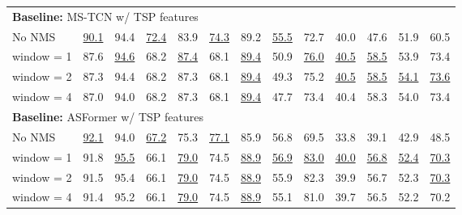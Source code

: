 \documentclass[runningheads]{llncs}
\newcommand{\best}[1]{\underline{#1}}
\begin{document}
\begin{table*}[p]
{\begin{tabularx}{\textwidth}{l
        rr
        rr
        rr
        rr
        rr
        rr
    }
        \midrule
        \multicolumn{13}{l}{{\bf Baseline:} MS-TCN w/ TSP features} \\
            \hspace{0.06in} No NMS
                & \best{90.1} & 94.4
                & \best{72.4} & 83.9
                & \best{74.3} & 89.2
                & \best{55.5} & 72.7
                & 40.0 & 47.6
                & 51.9 & 60.5 \\
            \hspace{0.06in} window = 1
                & 87.6 & \best{94.6}
                & 68.2 & \best{87.4}
                & 68.1 & \best{89.4}
                & 50.9 & \best{76.0}
                & \best{40.5} & \best{58.5}
                & 53.9 & 73.4 \\
            \hspace{0.06in} window = 2
                & 87.3 & 94.4
                & 68.2 & 87.3
                & 68.1 & \best{89.4}
                & 49.3 & 75.2
                & \best{40.5} & \best{58.5}
                & \best{54.1} & \best{73.6} \\
            \hspace{0.06in} window = 4
                & 87.0 & 94.0
                & 68.2 & 87.3
                & 68.1 & \best{89.4}
                & 47.7 & 73.4
                & 40.4 & 58.3
                & 54.0 & 73.4 \\

        \midrule
        \multicolumn{13}{l}{{\bf Baseline:} ASFormer w/ TSP features} \\
            \hspace{0.06in} No NMS
                & \best{92.1} & 94.0 & \best{67.2} & 75.3 & \best{77.1} & 85.9 & 56.8 & 69.5 & 33.8 & 39.1 & 42.9 & 48.5 \\
            \hspace{0.06in} window = 1
                & 91.8 & \best{95.5} & 66.1 & \best{79.0} & 74.5 & \best{88.9} & \best{56.9} & \best{83.0} & \best{40.0} & \best{56.8} & \best{52.4} & \best{70.3} \\
            \hspace{0.06in} window = 2
                & 91.5 & 95.4 & 66.1 & \best{79.0} & 74.5 & \best{88.9} & 55.9 & 82.3 & 39.9 & 56.7 & 52.3 & \best{70.3} \\
            \hspace{0.06in} window = 4
                & 91.4 & 95.2 & 66.1 & \best{79.0} & 74.5 & \best{88.9} & 55.1 & 81.0 & 39.7 & 56.5 & 52.2 & 70.2 \\
        \bottomrule
    \end{tabularx}
    }
\end{table*} 
\end{document}

